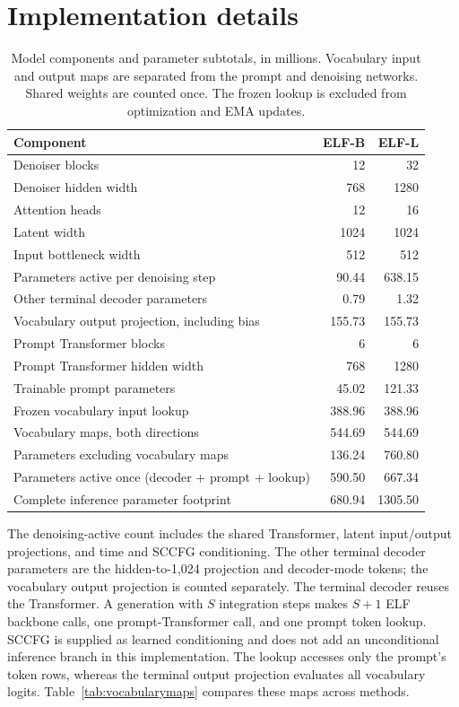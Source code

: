 \section{Implementation details}
\label{app:implementation}
\begin{table}[h]
\caption{Model components and parameter subtotals, in millions. Vocabulary input and output maps are separated from the prompt and denoising networks. Shared weights are counted once. The frozen lookup is excluded from optimization and EMA updates.}
\label{tab:components}
\centering\small
\begin{tabular}{lrr}
\toprule
Component & ELF-B & ELF-L\\
\midrule
Denoiser blocks & 12 & 32\\
Denoiser hidden width & 768 & 1280\\
Attention heads & 12 & 16\\
Latent width & 1024 & 1024\\
Input bottleneck width & 512 & 512\\
Parameters active per denoising step & 90.44 & 638.15\\
Other terminal decoder parameters & 0.79 & 1.32\\
Vocabulary output projection, including bias & 155.73 & 155.73\\
Prompt Transformer blocks & 6 & 6\\
Prompt Transformer hidden width & 768 & 1280\\
Trainable prompt parameters & 45.02 & 121.33\\
Frozen vocabulary input lookup & 388.96 & 388.96\\
Vocabulary maps, both directions & 544.69 & 544.69\\
Parameters excluding vocabulary maps & 136.24 & 760.80\\
Parameters active once (decoder + prompt + lookup) & 590.50 & 667.34\\
Complete inference parameter footprint & 680.94 & 1305.50\\
\bottomrule
\end{tabular}
\end{table}
The denoising-active count includes the shared Transformer, latent input/output projections, and time and SCCFG conditioning. The other terminal decoder parameters are the hidden-to-1,024 projection and decoder-mode tokens; the vocabulary output projection is counted separately. The terminal decoder reuses the Transformer. A generation with $S$ integration steps makes $S+1$ ELF backbone calls, one prompt-Transformer call, and one prompt token lookup. SCCFG is supplied as learned conditioning and does not add an unconditional inference branch in this implementation. The lookup accesses only the prompt's token rows, whereas the terminal output projection evaluates all vocabulary logits. Table~\ref{tab:vocabularymaps} compares these maps across methods.

